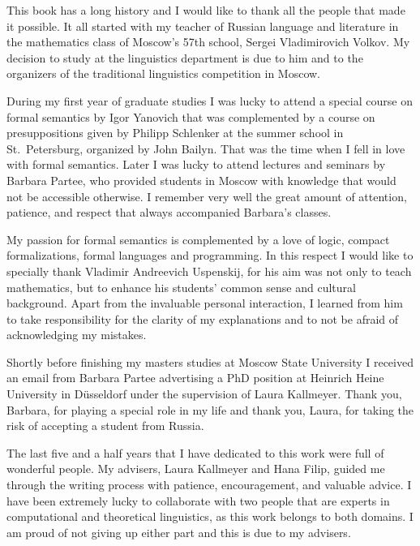 \begin{refsection}

This book has a long history and I would like to thank all the people that made it possible. It all started with my teacher of Russian language and literature in the mathematics class of Moscow's 57th school, Sergei Vladimirovich Volkov. My decision to study at the linguistics department is due to him and to the organizers of the traditional linguistics competition in Moscow.

During my first year of graduate studies I was lucky to attend a special course on formal semantics by Igor Yanovich that was complemented by a course on presuppositions given by Philipp Schlenker at the summer school in St.\ Petersburg, organized by John Bailyn. That was the time when I fell in love with formal semantics. Later I was lucky to attend lectures and seminars by Barbara Partee, who provided students in Moscow with knowledge that would not be accessible otherwise. I remember very well the great amount of attention, patience, and respect that always accompanied Barbara's classes. 

My passion for formal semantics is complemented by a love of logic, compact formalizations, formal languages and programming. In this respect I would like to specially thank Vladimir Andreevich Uspenskij, for his aim was not only to teach mathematics, but to enhance his students' common sense and cultural background. Apart from the invaluable personal interaction, I learned from him to take responsibility for the clarity of my explanations and to not be afraid of acknowledging my mistakes.

Shortly before finishing my masters studies at Moscow State University I received an email from Barbara Partee advertising a PhD position at Heinrich Heine University in Düsseldorf under the supervision of Laura Kallmeyer. Thank you, Barbara, for playing a special role in my life and thank you, Laura, for taking the risk of accepting a student from Russia.

The last five and a half years that I have dedicated to this work were full of wonderful people. My advisers, Laura Kallmeyer and Hana Filip, guided me through the writing process with patience, encouragement, and valuable advice. I have been extremely lucky to collaborate with two people that are experts in computational and theoretical linguistics, as this work belongs to both domains. I am proud of not giving up either part and this is due to my advisers. 


\end{refsection}
